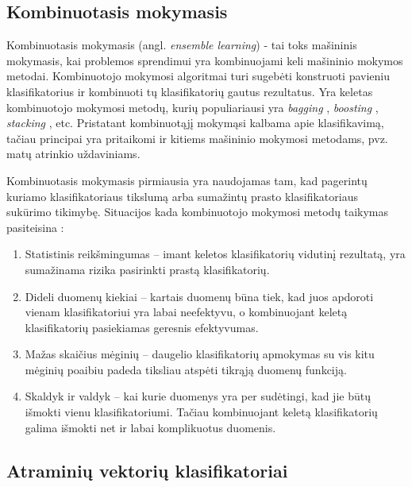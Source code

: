 

\subsection{Kombinuotasis mokymasis}

Kombinuotasis mokymasis (angl. \textit{ensemble learning}) - tai toks mašininis mokymasis, kai problemos sprendimui yra kombinuojami keli mašininio mokymos metodai. Kombinuotojo mokymosi algoritmai turi sugebėti konstruoti pavieniu klasifikatorius ir kombinuoti tų klasifikatorių gautus rezultatus. Yra keletas kombinuotojo mokymosi metodų, kurių populiariausi yra \textit{bagging} \cite{breiman1996bagging}, \textit{boosting} \cite{schapire2003boosting}, \textit{stacking} \cite{wolpert1992stacked}, etc. Pristatant kombinuotąjį mokymąsi kalbama apie klasifikavimą, tačiau principai yra pritaikomi ir kitiems mašininio mokymosi metodams, pvz. matų atrinkio uždaviniams. 

Kombinuotasis mokymasis pirmiausia yra naudojamas tam, kad pagerintų kuriamo klasifikatoriaus tikslumą arba sumažintų prasto klasifikatoriaus sukūrimo tikimybę. Situacijos kada kombinuotojo mokymosi metodų taikymas pasiteisina \cite{polikar2006ensemble}:
\begin{enumerate}
 \item Statistinis reikšmingumas -- imant keletos klasifikatorių vidutinį rezultatą, yra sumažinama rizika pasirinkti prastą klasifikatorių.
 \item Dideli duomenų kiekiai -- kartais duomenų būna tiek, kad juos apdoroti vienam klasifikatoriui yra labai neefektyvu, o kombinuojant keletą klasifikatorių pasiekiamas geresnis efektyvumas.
 \item Mažas skaičius mėginių -- daugelio klasifikatorių apmokymas su vis kitu mėginių poaibiu padeda tiksliau atspėti tikrąją duomenų funkciją.
 \item Skaldyk ir valdyk -- kai kurie duomenys yra per sudėtingi, kad jie būtų išmokti vienu klasifikatoriumi. Tačiau kombinuojant keletą klasifikatorių galima išmokti net ir labai komplikuotus duomenis. 
\end{enumerate}

\subsection{Atraminių vektorių klasifikatoriai}

